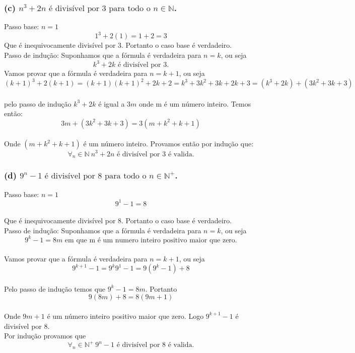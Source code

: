 \documentclass{article}
\begin{document}
\subsubsection*{(c) $n^3+2n \textrm{ é divisível por 3 para todo o } n \in \mathbb{N}$.}

Passo base: $n=1$
\[
  1^3 + 2(1) = 1 + 2 = 3
\]
Que é inequivocamente divisível por 3. Portanto o caso base é verdadeiro.
\\[\baselineskip]
Passo de indução: Suponhamos que a fórmula é verdadeira para $n=k$, ou seja
\[
  k^3 + 2k \textrm{ é divisível por 3.}
\]
Vamos provar que a fórmula é verdadeira para $n=k+1$, ou seja
\\[\baselineskip]
\[
  (k+1)^3 + 2(k+1) = (k+1)(k+1)^2 + 2k + 2 = k^3 + 3k^2 + 3k + 2k + 3 = (k^3 + 2k) + (3k^2+3k+3)
\]
\\[\baselineskip]
pelo passo de indução $k^3 + 2k$ é igual a $3m$ onde m é um número inteiro. Temos então:
\\[\baselineskip]
\[
  3m + (3k^2+3k+3) = 3(m + k^2 + k + 1)
\]
\\[\baselineskip]
Onde $(m + k^2 + k + 1)$ é um número inteiro. Provamos então por indução que:
\\[\baselineskip]
\[
  \forall_n \in \mathbb{N} \ n^3 + 2n \textrm{ é divisível por 3 é valida.}
\]

\subsubsection*{(d) $9^n-1 \textrm{ é divisível por 8 para todo o } n \in \mathbb{N}^+$.}

Passo base: $n = 1$
\\[\baselineskip]
\[
  9^1 - 1 = 8
\]
\\[\baselineskip]
Que é inequivocamente divisível por 8. Portanto o caso base é verdadeiro.
\\[\baselineskip]
Passo de indução: Suponhamos que a fórmula é verdadeira para $n=k$, ou seja
\\[\baselineskip]
\[
  9^k - 1 = 8m \textrm{ em que m é um numero inteiro positivo maior que zero.}
\]
\\[\baselineskip]
Vamos provar que a fórmula é verdadeira para $n=k+1$, ou seja
\\[\baselineskip]
\[
  9^{k+1} - 1 =  9^k9^1 - 1 = 9(9^k - 1)+8
\]
\\[\baselineskip]
Pelo passo de indução temos que $9^k - 1 = 8m$. Portanto
\\[\baselineskip]
\[
  9(8m)+8 = 8(9m + 1)
\]
\\[\baselineskip]
Onde $9m+1$ é um número inteiro positivo maior que zero. Logo $9^{k+1} - 1$ é divisível por 8.
\\[\baselineskip]
Por indução provamos que
\\[\baselineskip]
\[
  \forall_n \in \mathbb{N}^+ \ 9^n-1 \textrm{ é divisível por 8 é valida.}
\]
\end{document}
